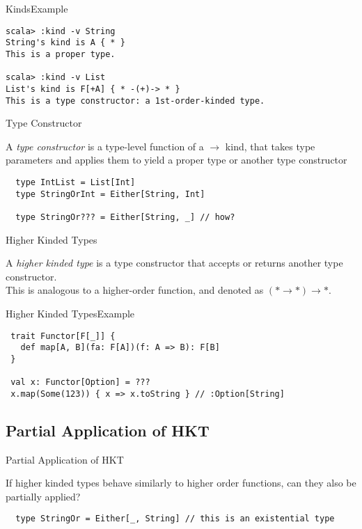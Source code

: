 \documentclass[aspectratio=169]{beamer}
\begin{document}
\begin{frame}[fragile]{Kinds}{Example}
\begin{verbatim}
scala> :kind -v String
String's kind is A { * }
This is a proper type.

scala> :kind -v List
List's kind is F[+A] { * -(+)-> * }
This is a type constructor: a 1st-order-kinded type.
\end{verbatim}
\end{frame}

\begin{frame}[fragile]{Type Constructor}
  \begin{block}{}
    A \textit{type constructor} is a type-level function of a $\rightarrow$ kind, that takes type
    parameters and applies them to yield a proper type or another type constructor
  \end{block}
  \bigskip
  \begin{verbatim}
  type IntList = List[Int]
  type StringOrInt = Either[String, Int]

  type StringOr??? = Either[String, _] // how?
  \end{verbatim}
\end{frame}

\begin{frame}{Higher Kinded Types}
  \begin{block}{}
    A \textit{higher kinded type} is a type constructor that accepts or returns another type constructor.\\
    This is analogous to a higher-order function, and denoted as $(* \rightarrow *) \rightarrow *$.
  \end{block}
\end{frame}

\begin{frame}[fragile]{Higher Kinded Types}{Example}
\begin{verbatim}
 trait Functor[F[_]] {
   def map[A, B](fa: F[A])(f: A => B): F[B]
 }

 val x: Functor[Option] = ???
 x.map(Some(123)) { x => x.toString } // :Option[String]
\end{verbatim}
\end{frame}

\subsection{Partial Application of HKT}
\begin{frame}[fragile]{Partial Application of HKT}
  \begin{block}{}
    If higher kinded types behave similarly to higher order functions, can they also be partially
    applied?
  \end{block}
  \bigskip
  \begin{verbatim}
  type StringOr = Either[_, String] // this is an existential type
  \end{verbatim}
\end{frame}
\end{document}
